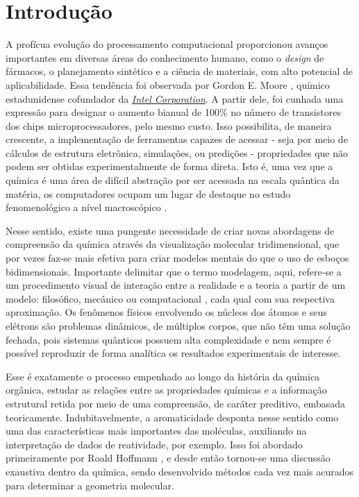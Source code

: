 \chapter{Introdução}

A profícua evolução do processamento computacional proporcionou avanços importantes em diversas áreas do conhecimento humano, como o \textit{design} de fármacos, o planejamento sintético e a ciência de materiais, com alto potencial de aplicabilidade. Essa tendência foi observada por Gordon E. Moore \autocite{Mack2011, Shalf2020}, químico estadunidense 
cofundador da \href{https://www.intel.com/content/www/us/en/company-overview/company-overview.html}{\textit{Intel Corporation}}. A partir dele, foi cunhada uma expressão para designar o aumento bianual de 100\% no número de transistores dos chips microprocessadores, pelo mesmo custo. Isso possibilita, de maneira crescente, a implementação de ferramentas capazes de acessar - seja por meio de cálculos de estrutura eletrônica, 
simulações, ou predições - propriedades que não podem ser obtidas experimentalmente de forma direta. Isto é, uma vez que a química é uma área de difícil abstração por ser acessada na escala quântica da matéria, os computadores ocupam um lugar de destaque no estudo fenomenológico a nível macroscópico \autocite{Allouche2010, Rayan2017}.

Nesse sentido, existe uma pungente necessidade de criar novas abordagens de compreensão da química através da visualização molecular tridimensional, que por vezes faz-se mais efetiva para criar modelos mentais do que o uso de esboços bidimensionais. Importante delimitar que o termo modelagem, aqui, refere-se a um procedimento visual de interação entre a realidade e a teoria a partir de um modelo: filosófico, mecânico ou computacional \autocite{Snyder2021}, cada qual com sua respectiva aproximação. Os fenômenos físicos envolvendo os núcleos dos átomos e seus elétrons são problemas dinâmicos, de múltiplos corpos, que não têm uma solução fechada, pois sistemas quânticos possuem alta complexidade e nem sempre é possível reproduzir de forma analítica os resultados experimentais de interesse.

Esse é exatamente o processo empenhado ao longo da história da química orgânica, estudar as relações entre as propriedades químicas e a informação estrutural retida por meio de uma compreensão, de caráter preditivo, embasada teoricamente. Indubitavelmente, a aromaticidade desponta nesse sentido como uma das características mais importantes das moléculas, auxiliando na interpretação de dados de reatividade, por exemplo. Isso foi abordado primeiramente por Roald Hoffmann \autocite{Hoffmann2014}, e desde então tornou-se uma discussão exaustiva dentro da química, sendo desenvolvido métodos cada vez mais acurados para determinar a geometria molecular.


